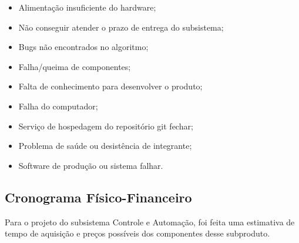 \begin{itemize}
\item Alimentação insuficiente do hardware;
\item Não conseguir atender o prazo de entrega do subsistema;
\item Bugs não encontrados no algoritmo;
\item Falha/queima de componentes;
\item Falta de conhecimento para desenvolver o produto;
\item Falha do computador;
\item Serviço de hospedagem do repositório git fechar;
\item Problema de saúde ou desistência de integrante;
\item Software de produção ou sistema falhar.
\end{itemize}

\subsection{Cronograma Físico-Financeiro}
Para o projeto do subsistema Controle e Automação, foi feita uma estimativa de tempo de aquisição e preços possíveis dos componentes desse subproduto.


